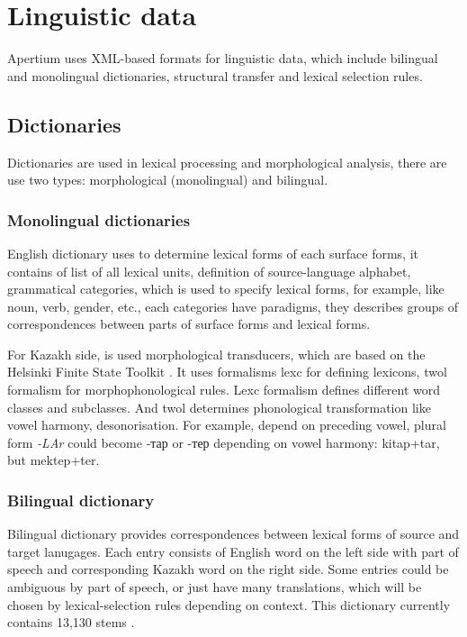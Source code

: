 \documentclass[11pt]{article}
\begin{document}
\section{Linguistic data}

Apertium uses XML-based formats for linguistic data, which include bilingual and monolingual dictionaries, structural transfer and
lexical selection rules. %

\subsection{Dictionaries}

Dictionaries are used in lexical processing and morphological analysis, there are use two types: morphological (monolingual) and bilingual.

\subsubsection{Monolingual dictionaries}

English dictionary uses to determine lexical forms of each surface forms, it contains of list of all lexical units, definition 
of source-language alphabet, grammatical categories, which is used to specify lexical forms, for example, like noun, verb, 
gender, etc., each categories have paradigms, they describes groups of correspondences between parts of surface forms and lexical forms. 

For Kazakh side, is used morphological transducers, which are based on the Helsinki Finite State Toolkit \citep{hfst/2011}. It 
uses formalisms lexc for defining lexicons, twol formalism for morphophonological rules. Lexc formalism defines different 
word classes and subclasses. And twol determines phonological transformation like vowel harmony, desonorisation. For example, 
depend on preceding vowel, plural form \emph{-LAr} could become -тар or -тер depending on vowel harmony: kitap+tar, but mektep+ter.

\subsubsection{Bilingual dictionary}

Bilingual dictionary provides correspondences between lexical forms of source and target lanugages. Each entry 
consists of English word on the left side with part of speech and corresponding Kazakh word on the right side. 
Some entries could be ambiguous by part of speech, or just have many translations, which will be chosen by 
lexical-selection rules depending on context. This dictionary currently contains 13,130 stems \citep{sundetova13a}.
\end{document}
